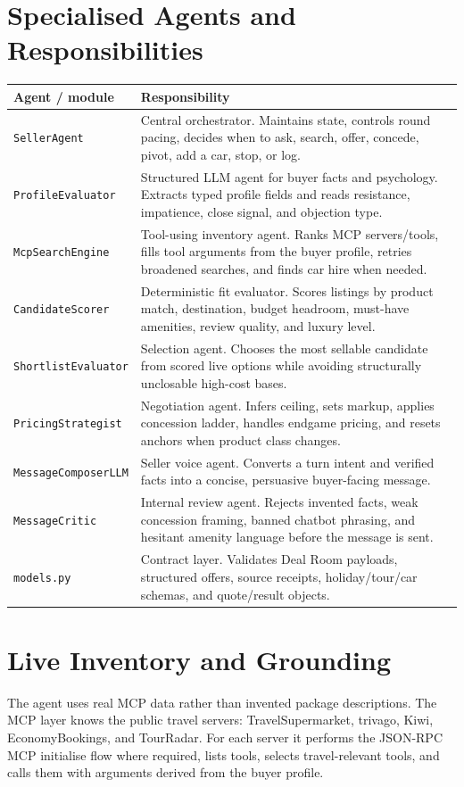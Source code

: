 \documentclass[10pt,a4paper]{article}
\begin{document}
\section*{Specialised Agents and Responsibilities}
\begin{center}
\small
\begin{tabular}{@{}p{3.4cm}p{10.4cm}@{}}
\toprule
\textbf{Agent / module} & \textbf{Responsibility} \\
\midrule
\texttt{SellerAgent} & Central orchestrator. Maintains state, controls round pacing, decides when to ask, search, offer, concede, pivot, add a car, stop, or log. \\
\texttt{ProfileEvaluator} & Structured LLM agent for buyer facts and psychology. Extracts typed profile fields and reads resistance, impatience, close signal, and objection type. \\
\texttt{McpSearchEngine} & Tool-using inventory agent. Ranks MCP servers/tools, fills tool arguments from the buyer profile, retries broadened searches, and finds car hire when needed. \\
\texttt{CandidateScorer} & Deterministic fit evaluator. Scores listings by product match, destination, budget headroom, must-have amenities, review quality, and luxury level. \\
\texttt{ShortlistEvaluator} & Selection agent. Chooses the most sellable candidate from scored live options while avoiding structurally unclosable high-cost bases. \\
\texttt{PricingStrategist} & Negotiation agent. Infers ceiling, sets markup, applies concession ladder, handles endgame pricing, and resets anchors when product class changes. \\
\texttt{MessageComposerLLM} & Seller voice agent. Converts a turn intent and verified facts into a concise, persuasive buyer-facing message. \\
\texttt{MessageCritic} & Internal review agent. Rejects invented facts, weak concession framing, banned chatbot phrasing, and hesitant amenity language before the message is sent. \\
\texttt{models.py} & Contract layer. Validates Deal Room payloads, structured offers, source receipts, holiday/tour/car schemas, and quote/result objects. \\
\bottomrule
\end{tabular}
\end{center}

\section*{Live Inventory and Grounding}
The agent uses real MCP data rather than invented package descriptions. The MCP layer knows the public travel servers: TravelSupermarket, trivago, Kiwi, EconomyBookings, and TourRadar. For each server it performs the JSON-RPC MCP initialise flow where required, lists tools, selects travel-relevant tools, and calls them with arguments derived from the buyer profile.
\end{document}
